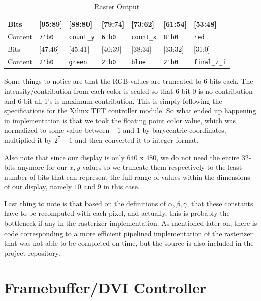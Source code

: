 \documentclass[letterpaper,10pt]{article}
\begin{document}
\begin{table}[h]
\begin{center}
\begin{tabular}{ | l | l | l | l | l | l | l |}
\hline
Bits & [95:89] & [88:80] & [79:74] & [73:62] & [61:54] & [53:48] \\ \hline
Content & \verb!7'b0! & \verb!count_y! & \verb!6'b0! & \verb!count_x! & \verb!8'b0! & \verb!red!  \\ \hline
Bits & [47:46] & [45:41] & [40:39] & [38:34] & [33:32] & [31:0] \\ \hline
Content & \verb!2'b0! & \verb!green! & \verb!2'b0! & \verb!blue! & \verb!2'b0! & \verb!final_z_i! \\ \hline
\end{tabular}
\end{center}
\caption{Raster Output}
\end{table}

Some things to notice are that the RGB values are truncated to 6 bits each. The intensity/contribution from each color is scaled so that 6-bit 0 is no contribution and 6-bit all 1's is maximum contribution. This is simply following the specifications for the Xilinx TFT controller module. So what ended up happening in implementation is that we took the floating point color value, which was normalized to some value between $-1$ and $1$ by barycentric coordinates, multiplied it by $2^{7}-1$ and then converted it to integer format. 

Also note that since our display is only $640$ x $480$, we do not need the entire 32-bits anymore for our $x,y$ values so we truncate them respectively to the least number of bits that can represent the full range of values within the dimensions of our display, namely $10$ and $9$ in this case.

Last thing to note is that based on the definitions of $\alpha, \beta, \gamma$, that these constants have to be recomputed with each pixel, and actually, this is probably the bottleneck if any in the rasterizer implementation. As mentioned later on, there is code corresponding to a more efficient pipelined implementation of the rasterizer that was not able to be completed on time, but the source is also included in the project repository.

\section{Framebuffer/DVI Controller}
\end{document}
